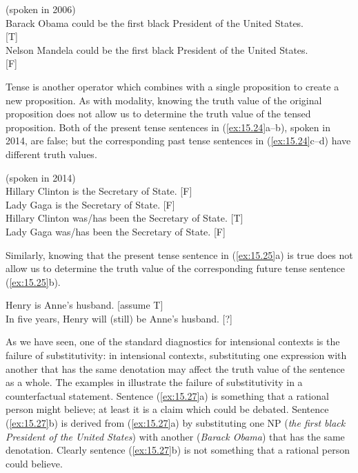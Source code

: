 \ea \label{ex:15.23}
(spoken in 2006)\\
\ea  Barack Obama could be the first black President of the United States.  \\ \hfill  [T]\\
\ex Nelson Mandela could be the first black President of the United States.  \\ \hfill [F]
                       \z
\z


Tense is another operator which combines with a single proposition to create a new proposition. As with modality, knowing the truth value of the original proposition does not allow us to determine the truth value of the tensed proposition. Both of the present tense sentences in (\ref{ex:15.24}a--b), spoken in 2014, are false; but the corresponding past tense sentences in (\ref{ex:15.24}c--d) have different truth values.


\ea \label{ex:15.24}
(spoken in 2014)\\
\ea  Hillary Clinton is the Secretary of State. \hfill  [F]\\
\ex Lady Gaga is the Secretary of State. \hfill  [F]\\
\ex Hillary Clinton was/has been the Secretary of State. \hfill  [T]\\
\ex Lady Gaga was/has been the Secretary of State. \hfill  [F]
                       \z
\z


Similarly, knowing that the present tense sentence in (\ref{ex:15.25}a) is true does not allow us to determine the truth value of the corresponding future tense sentence (\ref{ex:15.25}b).


\ea \label{ex:15.25}
\ea  Henry is Anne’s husband. \hfill [assume T]\\
\ex In five years, Henry will (still) be Anne’s husband.  \hfill [?]
                       \z
\z


As we have seen, one of the standard diagnostics for intensional contexts is the failure of substitutivity: in intensional contexts, substituting one expression with another that has the same denotation may affect the truth value of the sentence as a whole. The examples in  illustrate the failure of substitutivity in a counterfactual statement. Sentence (\ref{ex:15.27}a) is something that a rational person might believe; at least it is a claim which could be debated. Sentence (\ref{ex:15.27}b) is derived from (\ref{ex:15.27}a) by substituting one NP (\textit{the first black President of the United States}) with another (\textit{Barack Obama}) that has the same denotation. Clearly sentence (\ref{ex:15.27}b) is not something that a rational person could believe.


